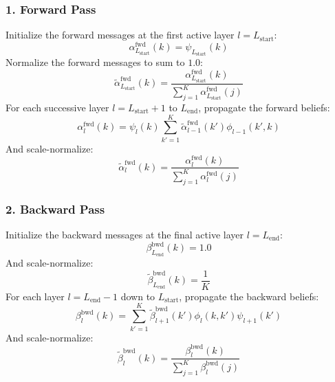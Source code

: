 \subsubsection{1. Forward Pass}
Initialize the forward messages at the first active layer $l = L_{\text{start}}$:
\begin{equation}
    \alpha^{\text{fwd}}_{L_{\text{start}}}(k) = \psi_{L_{\text{start}}}(k)
\end{equation}
Normalize the forward messages to sum to $1.0$:
\begin{equation}
    \tilde{\alpha}^{\text{fwd}}_{L_{\text{start}}}(k) = \frac{\alpha^{\text{fwd}}_{L_{\text{start}}}(k)}{\sum_{j=1}^K \alpha^{\text{fwd}}_{L_{\text{start}}}(j)}
\end{equation}
For each successive layer $l = L_{\text{start}}+1$ to $L_{\text{end}}$, propagate the forward beliefs:
\begin{equation}
    \alpha^{\text{fwd}}_l(k) = \psi_l(k) \sum_{k'=1}^K \tilde{\alpha}^{\text{fwd}}_{l-1}(k') \phi_{l-1}(k', k)
\end{equation}
And scale-normalize:
\begin{equation}
    \tilde{\alpha}^{\text{fwd}}_l(k) = \frac{\alpha^{\text{fwd}}_l(k)}{\sum_{j=1}^K \alpha^{\text{fwd}}_l(j)}
\end{equation}

\subsubsection{2. Backward Pass}
Initialize the backward messages at the final active layer $l = L_{\text{end}}$:
\begin{equation}
    \beta^{\text{bwd}}_{L_{\text{end}}}(k) = 1.0
\end{equation}
And scale-normalize:
\begin{equation}
    \tilde{\beta}^{\text{bwd}}_{L_{\text{end}}}(k) = \frac{1}{K}
\end{equation}
For each layer $l = L_{\text{end}}-1$ down to $L_{\text{start}}$, propagate the backward beliefs:
\begin{equation}
    \beta^{\text{bwd}}_l(k) = \sum_{k'=1}^K \tilde{\beta}^{\text{bwd}}_{l+1}(k') \phi_l(k, k') \psi_{l+1}(k')
\end{equation}
And scale-normalize:
\begin{equation}
    \tilde{\beta}^{\text{bwd}}_l(k) = \frac{\beta^{\text{bwd}}_l(k)}{\sum_{j=1}^K \beta^{\text{bwd}}_l(j)}
\end{equation}

